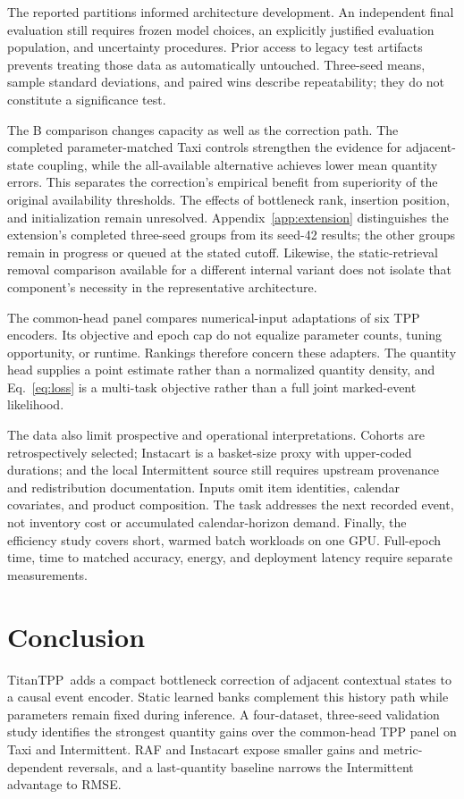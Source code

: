 \documentclass[runningheads]{llncs}
\newcommand{\method}{TitanTPP}
\begin{document}
The reported partitions informed architecture development. An independent
final evaluation still requires frozen model choices, an explicitly justified
evaluation population, and uncertainty procedures. Prior access to legacy
test artifacts prevents treating those data as automatically untouched.
Three-seed means, sample standard deviations, and paired wins describe
repeatability; they do not constitute a significance test.

The B comparison changes capacity as well as the correction path. The
completed parameter-matched Taxi controls strengthen the evidence for
adjacent-state coupling, while the all-available alternative achieves lower
mean quantity errors. This separates the correction's empirical benefit
from superiority of the original availability thresholds. The effects of
bottleneck rank, insertion position, and initialization remain unresolved.
Appendix~\ref{app:extension} distinguishes the extension's completed
three-seed groups from its seed-42 results; the other groups remain in
progress or queued at the stated cutoff. Likewise, the static-retrieval
removal comparison available for a different internal variant does not
isolate that component's necessity in the representative architecture.

The common-head panel compares numerical-input adaptations of six TPP
encoders. Its objective and epoch cap do not equalize parameter counts,
tuning opportunity, or runtime. Rankings therefore concern these adapters.
The quantity head supplies a point estimate rather than a normalized quantity
density, and Eq.~\eqref{eq:loss} is a multi-task objective rather than a full
joint marked-event likelihood.

The data also limit prospective and operational interpretations. Cohorts are
retrospectively selected; Instacart is a basket-size proxy with upper-coded
durations; and the local Intermittent source still requires upstream
provenance and redistribution documentation. Inputs omit item identities,
calendar covariates, and product composition. The task addresses the next
recorded event, not inventory cost or accumulated calendar-horizon demand.
Finally, the efficiency study covers short, warmed batch workloads on one
GPU. Full-epoch time, time to matched accuracy, energy, and deployment
latency require separate measurements.

\section{Conclusion}
\method\ adds a compact bottleneck correction of adjacent contextual states
to a causal event encoder. Static learned banks complement this history
path while parameters remain fixed during inference. A four-dataset,
three-seed validation study identifies the strongest quantity gains over
the common-head TPP panel on Taxi and Intermittent. RAF and Instacart expose
smaller gains and metric-dependent reversals, and a last-quantity baseline
narrows the Intermittent advantage to RMSE.
\end{document}
